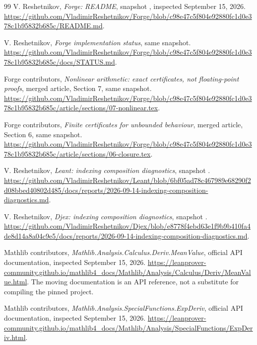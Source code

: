 \clearpage
\begin{thebibliography}{99}
\small
{}
V. Reshetnikov, \emph{Forge: README}, snapshot
, inspected September 15, 2026.
\url{https://github.com/VladimirReshetnikov/Forge/blob/c98e47c5f804e92880fc1d0e378c1b95832b685c/README.md}.

V. Reshetnikov, \emph{Forge implementation status}, same snapshot.
\url{https://github.com/VladimirReshetnikov/Forge/blob/c98e47c5f804e92880fc1d0e378c1b95832b685c/docs/STATUS.md}.

Forge contributors, \emph{Nonlinear arithmetic: exact certificates, not floating-point proofs},
merged article, Section 7, same snapshot.
\url{https://github.com/VladimirReshetnikov/Forge/blob/c98e47c5f804e92880fc1d0e378c1b95832b685c/article/sections/07-nonlinear.tex}.

Forge contributors, \emph{Finite certificates for unbounded behaviour},
merged article, Section 6, same snapshot.
\url{https://github.com/VladimirReshetnikov/Forge/blob/c98e47c5f804e92880fc1d0e378c1b95832b685c/article/sections/06-closure.tex}.

V. Reshetnikov, \emph{Leant: indexing composition diagnostics}, snapshot
.
\url{https://github.com/VladimirReshetnikov/Leant/blob/6bf05ad78c467989e68290f2d08bbed40802d485/docs/reports/2026-09-14-indexing-composition-diagnostics.md}.

V. Reshetnikov, \emph{Djex: indexing composition diagnostics}, snapshot
.
\url{https://github.com/VladimirReshetnikov/Djex/blob/e8778f4ebd63e1f9b9b410fa4de8d14a8a04c9e5/docs/reports/2026-09-14-indexing-composition-diagnostics.md}.

Mathlib contributors, \emph{Mathlib.Analysis.Calculus.Deriv.MeanValue},
official API documentation, inspected September 15, 2026.
\url{https://leanprover-community.github.io/mathlib4_docs/Mathlib/Analysis/Calculus/Deriv/MeanValue.html}.
The moving documentation is an API reference, not a substitute for compiling the pinned project.

Mathlib contributors, \emph{Mathlib.Analysis.SpecialFunctions.ExpDeriv},
official API documentation, inspected September 15, 2026.
\url{https://leanprover-community.github.io/mathlib4_docs/Mathlib/Analysis/SpecialFunctions/ExpDeriv.html}.


\end{thebibliography}
